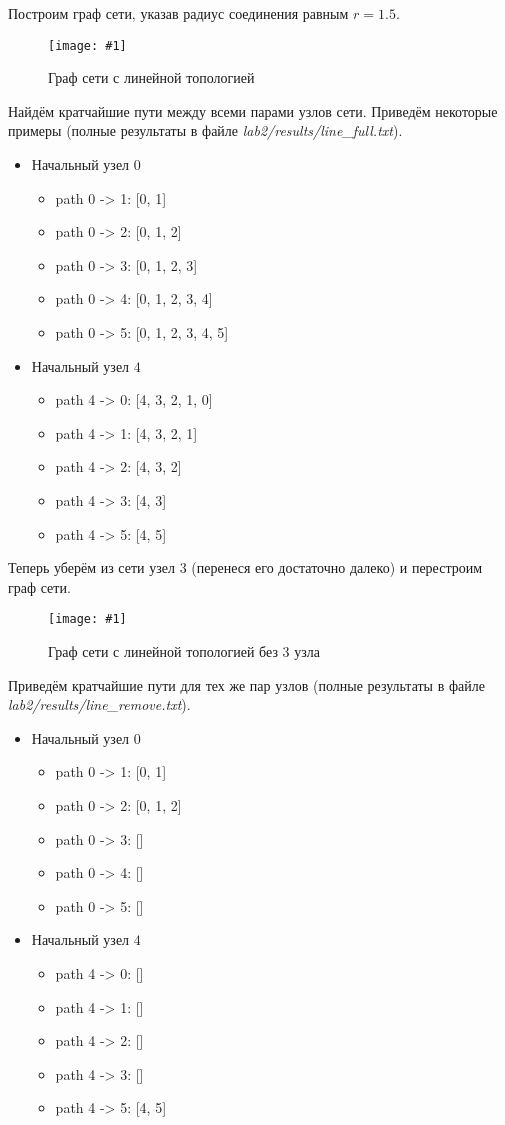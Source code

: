 \documentclass[a4paper,12pt]{article}
\newcommand{\plot}[3]{
    \begin{figure}[H]
        \begin{center}
            \texttt{[image: \#1]}
            \caption{#2}
            \label{#3}
        \end{center}
    \end{figure}
}
\begin{document}
    Построим граф сети, указав радиус соединения равным $ r = 1.5 $.
    \plot{full_line}{Граф сети с линейной топологией}{p:fullLine}

    Найдём кратчайшие пути между всеми парами узлов сети.
    Приведём некоторые примеры (полные результаты в файле \textsl{lab2/results/line\_full.txt}).
    \begin{itemize}
        \item Начальный узел $ 0 $
        \begin{itemize}
            \item path 0 -> 1: [0, 1]
            \item path 0 -> 2: [0, 1, 2]
            \item path 0 -> 3: [0, 1, 2, 3]
            \item path 0 -> 4: [0, 1, 2, 3, 4]
            \item path 0 -> 5: [0, 1, 2, 3, 4, 5]
        \end{itemize} 
        \item Начальный узел $ 4 $
        \begin{itemize}
            \item path 4 -> 0: [4, 3, 2, 1, 0]
            \item path 4 -> 1: [4, 3, 2, 1]
            \item path 4 -> 2: [4, 3, 2]
            \item path 4 -> 3: [4, 3]
            \item path 4 -> 5: [4, 5]
        \end{itemize} 
    \end{itemize}

    Теперь уберём из сети узел $ 3 $ (перенеся его достаточно далеко)
    и перестроим граф сети.
    \plot{rm_line}{Граф сети с линейной топологией без $ 3 $ узла}{p:rmLine}

    Приведём кратчайшие пути для тех же пар узлов (полные результаты в файле \textsl{lab2/results/line\_remove.txt}).
    \begin{itemize}
        \item Начальный узел $ 0 $
        \begin{itemize}
            \item path 0 -> 1: [0, 1]
            \item path 0 -> 2: [0, 1, 2]
            \item path 0 -> 3: []
            \item path 0 -> 4: []
            \item path 0 -> 5: []
        \end{itemize} 
        \item Начальный узел $ 4 $
        \begin{itemize}
            \item path 4 -> 0: []
            \item path 4 -> 1: []
            \item path 4 -> 2: []
            \item path 4 -> 3: []
            \item path 4 -> 5: [4, 5]
        \end{itemize} 
    \end{itemize}
\end{document}
